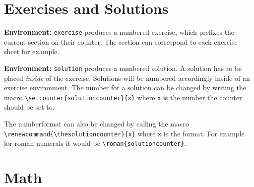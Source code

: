 \documentclass[10pt]{article}
\newcommand{\environmentcmd}[1]{\par\noindent\textbf{Environment:} \lstinline^#1^}
\begin{document}
\newpage
\section{Exercises and Solutions}
\environmentcmd{exercise} produces a numbered exercise, which prefixes the current section on their counter. The section can correspond to each exercise sheet for example.

\environmentcmd{solution} produces a numbered solution. A solution has to be placed \emph{inside} of the exercise. Solutions will be numbered accordingly inside of an exercise environment. The number for a solution can be changed by writing the macro \lstinline^\setcounter{solutioncounter}{x}^ where \lstinline^x^ is the number the counter should be set to.

The numberformat can also be changed by calling the macro \lstinline^\renewcommand{\thesolutioncounter}{x}^ where \lstinline^x^ is the format. For example for roman numerals it would be \lstinline^\roman{solutioncounter}^.

\begin{exercise}
  \lipsum[1-1]
  \begin{solution}
    \lipsum[1-1]
  \end{solution}
  \begin{solution}
    \lipsum[1-1]
  \end{solution}
  \begin{solution}
    \lipsum[1-1]
  \end{solution}
\end{exercise}

\begin{exercise}[title=Übung]
  \lipsum[1-1]
  \begin{solution}
    \lipsum[1-1]
  \end{solution}
\end{exercise}

\begin{exercise}
  \renewcommand{\thesolutioncounter}{(\roman{solutioncounter})}%
  \lipsum[1-1]
  \begin{solution}
  \end{solution}
  \begin{solution}
  \end{solution}
\end{exercise}

\section{Math}
\end{document}
